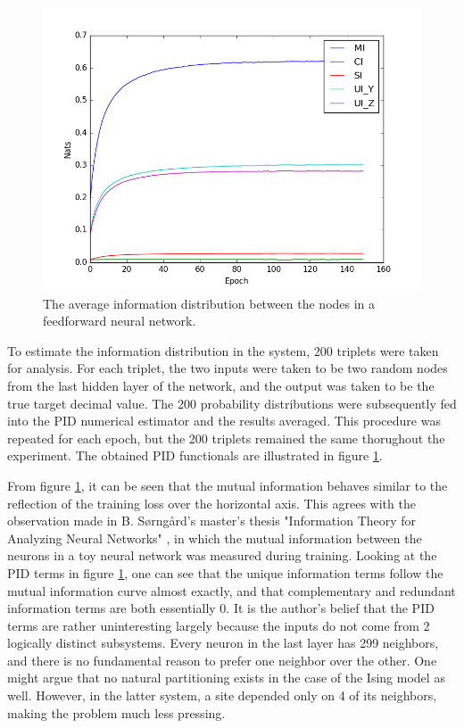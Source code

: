 \documentclass[12pt]{article}
\begin{document}
\begin{figure} [h]
\begin{center}
\includegraphics[width=.9\textwidth]{neural-net-pid}
\caption{The average information distribution between the nodes in a feedforward neural network.}
\label{fig:neural-net-pid}
\end{center}
\end{figure}

To estimate the information distribution in the system, 200 triplets were taken for analysis. For each triplet, the two inputs were taken to be two random nodes from the last hidden layer of the network, and the output was taken to be the true target decimal value. The 200 probability distributions were subsequently fed into the PID numerical estimator and the results averaged. This procedure was repeated for each epoch, but the 200 triplets remained the same thorughout the experiment. The obtained PID functionals are illustrated in figure \ref{fig:neural-net-pid}.

From figure \ref{fig:neural-net-pid}, it can be seen that the mutual information behaves similar to the reflection of the training loss over the horizontal axis. This agrees with the observation made in B. Sørngård's master's thesis "Information Theory for Analyzing Neural Networks" \cite{it-neural-nets}, in which the mutual information between the neurons in a toy neural network was measured during training. Looking at the PID terms in figure \ref{fig:neural-net-pid}, one can see that the unique information terms follow the mutual information curve almost exactly, and that complementary and redundant information terms are both essentially 0. It is the author's belief that the PID terms are rather uninteresting largely because the inputs do not come from 2 logically distinct subsystems. Every neuron in the last layer has 299 neighbors, and there is no fundamental reason to prefer one neighbor over the other. One might argue that no natural partitioning exists in the case of the Ising model as well. However, in the latter system, a site depended only on 4 of its neighbors, making the problem much less pressing. 
\end{document}
